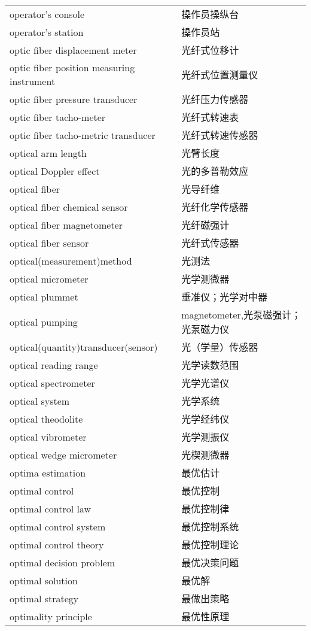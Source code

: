 \documentclass[
]{article}
\begin{document}
\begin{longtable}[]{@{}ll@{}}
operator's console & 操作员操纵台 \\
operator's station & 操作员站 \\
optic fiber displacement meter & 光纤式位移计 \\
optic fiber position measuring instrument & 光纤式位置测量仪 \\
optic fiber pressure transducer & 光纤压力传感器 \\
optic fiber tacho-meter & 光纤式转速表 \\
optic fiber tacho-metric transducer & 光纤式转速传感器 \\
optical arm length & 光臂长度 \\
optical Doppler effect & 光的多普勒效应 \\
optical fiber & 光导纤维 \\
optical fiber chemical sensor & 光纤化学传感器 \\
optical fiber magnetometer & 光纤磁强计 \\
optical fiber sensor & 光纤式传感器 \\
optical(measurement)method & 光测法 \\
optical micrometer & 光学测微器 \\
optical plummet & 垂准仪；光学对中器 \\
optical pumping & magnetometer,光泵磁强计；光泵磁力仪 \\
optical(quantity)transducer(sensor) & 光（学量）传感器 \\
optical reading range & 光学读数范围 \\
optical spectrometer & 光学光谱仪 \\
optical system & 光学系统 \\
optical theodolite & 光学经纬仪 \\
optical vibrometer & 光学测振仪 \\
optical wedge micrometer & 光楔测微器 \\
optima estimation & 最优估计 \\
optimal control & 最优控制 \\
optimal control law & 最优控制律 \\
optimal control system & 最优控制系统 \\
optimal control theory & 最优控制理论 \\
optimal decision problem & 最优决策问题 \\
optimal solution & 最优解 \\
optimal strategy & 最做出策略 \\
optimality principle & 最优性原理 \\

\end{longtable}
\end{document}
